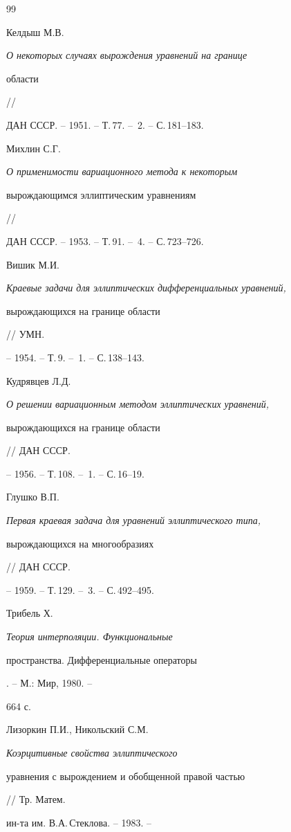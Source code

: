\begin{thebibliography}{99}







Келдыш М.В. {\em О некоторых случаях вырождения уравнений на границе


области} //


ДАН СССР. -- 1951. -- Т.\,77. -- \No\,2. -- С.\,181--183.




 Михлин С.Г. {\em О применимости вариационного метода к некоторым


 вырождающимся эллиптическим уравнениям} //


 ДАН СССР. -- 1953. -- Т.\,91. -- \No\,4. -- С.\,723--726.




 Вишик М.И. {\em Краевые задачи для эллиптических дифференциальных уравнений,


вырождающихся на границе области} // УМН.


-- 1954. -- Т.\,9. -- \No\,1. -- С.\,138--143.




 Кудрявцев Л.Д. {\em О решении вариационным методом эллиптических уравнений, 


вырождающихся на границе области} // ДАН СССР.


-- 1956. -- Т.\,108. -- \No\,1. -- С.\,16--19.




 Глушко В.П. {\em Первая краевая задача для уравнений эллиптического типа, 


вырождающихся на многообразиях} // ДАН СССР.


-- 1959. -- Т.\,129. -- \No\,3. -- С.\,492--495.




 Трибель Х. {\em Теория интерполяции. Функциональные


пространства. Дифференциальные операторы}. -- М.: Мир, 1980. --


664 с.




Лизоркин П.И., Никольский С.М. {\em Коэрцитивные свойства эллиптического


уравнения с вырождением и обобщенной правой частью} // Тр. Матем.


ин-та им. В.А.\,Стеклова. -- 1983. --



\end{thebibliography}
